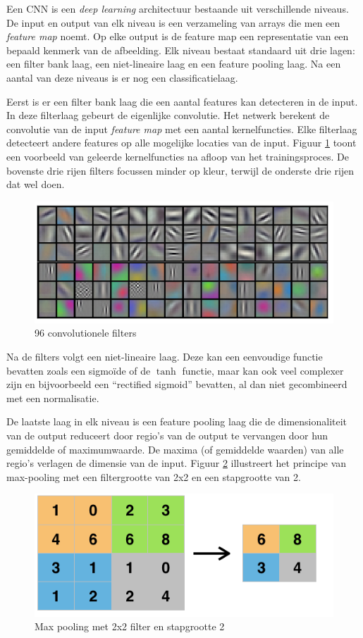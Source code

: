 Een CNN is een \emph{deep learning} architectuur bestaande uit verschillende niveaus. De input en output van elk niveau is een verzameling van arrays die men een \emph{feature map} noemt. Op elke output is de feature map een representatie van een bepaald kenmerk van de afbeelding. Elk niveau bestaat standaard uit drie lagen: een filter bank laag, een niet-lineaire laag en een feature pooling laag. Na een aantal van deze niveaus is er nog een classificatielaag.

Eerst is er een filter bank laag die een aantal features kan detecteren in de input. In deze filterlaag gebeurt de eigenlijke convolutie. Het netwerk berekent de convolutie van de input \emph{feature map} met een aantal kernelfuncties. Elke filterlaag detecteert andere features op alle mogelijke locaties van de input. Figuur \ref{fig:cnnfilters} toont een voorbeeld van geleerde kernelfuncties na afloop van het trainingsproces. De bovenste drie rijen filters focussen minder op kleur, terwijl de onderste drie rijen dat wel doen.

\begin{figure}[tb]
    \centering
    \includegraphics[width=.7\textwidth]{Images/cnnfilters.png}
    \caption{96 convolutionele filters\cite{Krizhevsky2012a}}
    \label{fig:cnnfilters}
\end{figure}

Na de filters volgt een niet-lineaire laag. Deze kan een eenvoudige functie bevatten zoals een sigmo\"ide of de $\tanh$ functie, maar kan ook veel complexer zijn en bijvoorbeeld een ``rectified sigmoid'' bevatten, al dan niet gecombineerd met een normalisatie.

De laatste laag in elk niveau is een feature pooling laag die de dimensionaliteit van de output reduceert door regio's van de output te vervangen door hun gemiddelde of maximumwaarde. De maxima (of gemiddelde waarden) van alle regio's verlagen de dimensie van de input. Figuur \ref{fig:maxpool} illustreert het principe van max-pooling met een filtergrootte van 2x2 en een stapgrootte van 2. 

\begin{figure}[tb]
    \centering
    \includegraphics[width=0.6\linewidth]{Images/maxpool.png}
    \caption{Max pooling met 2x2 filter en stapgrootte 2}
    \label{fig:maxpool}
\end{figure}

